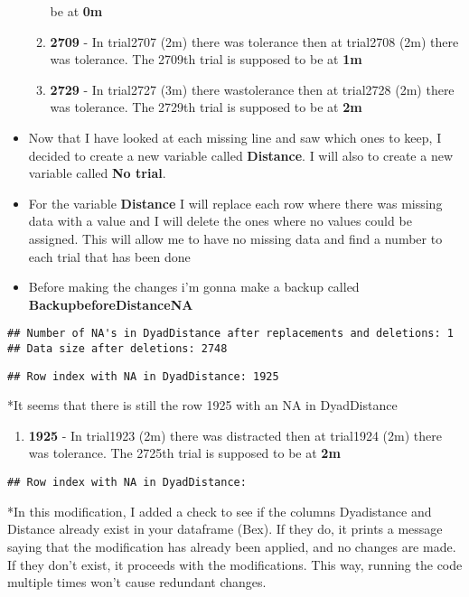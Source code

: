 \documentclass[
]{article}
\providecommand{\tightlist}{%
  \setlength{\itemsep}{0pt}\setlength{\parskip}{0pt}}
\begin{document}
\begin{itemize}
\begin{enumerate}
    be at \textbf{0m}
  \item
    \textbf{2709} - In trial2707 (2m) there was tolerance then at
    trial2708 (2m) there was tolerance. The 2709th trial is supposed to
    be at \textbf{1m}
  \item
    \textbf{2729} - In trial2727 (3m) there wastolerance then at
    trial2728 (2m) there was tolerance. The 2729th trial is supposed to
    be at \textbf{2m}
  \end{enumerate}
\item
  Now that I have looked at each missing line and saw which ones to
  keep, I decided to create a new variable called \textbf{Distance}. I
  will also to create a new variable called \textbf{No trial}.
\item
  For the variable \textbf{Distance} I will replace each row where there
  was missing data with a value and I will delete the ones where no
  values could be assigned. This will allow me to have no missing data
  and find a number to each trial that has been done
\item
  Before making the changes i'm gonna make a backup called
  \textbf{BackupbeforeDistanceNA}
\end{itemize}

\begin{verbatim}
## Number of NA's in DyadDistance after replacements and deletions: 1 
## Data size after deletions: 2748
\end{verbatim}

\begin{verbatim}
## Row index with NA in DyadDistance: 1925
\end{verbatim}

*It seems that there is still the row 1925 with an NA in DyadDistance

\begin{enumerate}
\def\labelenumi{\arabic{enumi}.}
\setcounter{enumi}{69}
\tightlist
\item
  \textbf{1925} - In trial1923 (2m) there was distracted then at
  trial1924 (2m) there was tolerance. The 2725th trial is supposed to be
  at \textbf{2m}
\end{enumerate}

\begin{verbatim}
## Row index with NA in DyadDistance:
\end{verbatim}

*In this modification, I added a check to see if the columns Dyadistance
and Distance already exist in your dataframe (Bex). If they do, it
prints a message saying that the modification has already been applied,
and no changes are made. If they don't exist, it proceeds with the
modifications. This way, running the code multiple times won't cause
redundant changes.
\end{document}
